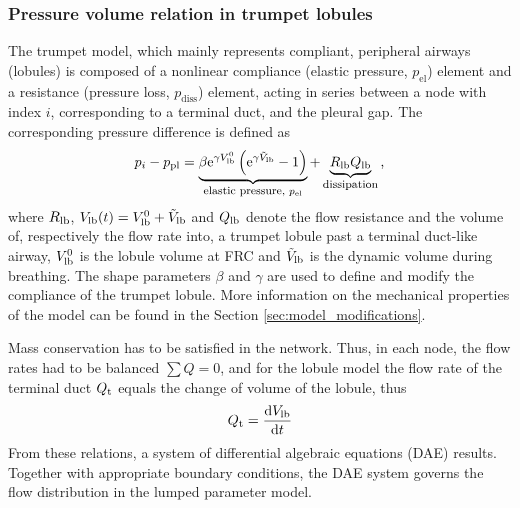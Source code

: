 \subsubsection{Pressure volume relation in trumpet lobules}
The trumpet model, which mainly represents compliant, peripheral airways (lobules) is composed of a nonlinear compliance (elastic pressure, $p_\mathrm{el}$) element and a resistance (pressure loss, $p_\mathrm{diss}$) element, acting in series between a node with index $i$, corresponding to a terminal duct, and the pleural gap.
The corresponding pressure difference is defined as
\begin{equation} \label{eqn:constitutiveLaw}
p_i - p_\mathrm{pl} = \underbrace{\beta\mathrm{e}^{\gamma V_\mathrm{lb}^0}\left(\mathrm{e}^{\gamma \tilde{V}_\mathrm{lb}} - 1\right)}_{\text{\footnotesize{elastic pressure, }} p_\mathrm{el}} + \underbrace{R_\mathrm{lb}Q_\mathrm{lb}}_\text{\footnotesize{dissipation}}\text{,}
\end{equation}
where $R_{\mathrm{lb}}$, $V_{\mathrm{lb}}(t) = V_{\mathrm{lb}}^0 + \tilde{V}_{\mathrm{lb}}$ and $Q_{\mathrm{lb}}$ denote the flow resistance and the volume of, respectively the flow rate into, a trumpet lobule past a terminal duct-like airway, $V_{\mathrm{lb}}^0$ is the lobule volume at FRC and $\tilde{V}_{\mathrm{lb}}$ is the dynamic volume during breathing.
The shape parameters $\beta$ and $\gamma$ are used to define and modify the compliance of the trumpet lobule.
More information on the mechanical properties of the model can be found in the Section \ref{sec:model_modifications}.

Mass conservation has to be satisfied in the network.
Thus, in each node, the flow rates had to be balanced $\sum Q = 0$, and for the lobule model the flow rate of the terminal duct $Q_{\mathrm{t}}$ equals the change of volume of the lobule, thus
\begin{equation}
  Q_{\mathrm{t}} = \frac{\mathrm{d} V_{\mathrm{lb}}}{\mathrm{d} t}
\end{equation}
From these relations, a system of differential algebraic equations (DAE) results.
Together with appropriate boundary conditions, the DAE system governs the flow distribution in the lumped parameter model.

